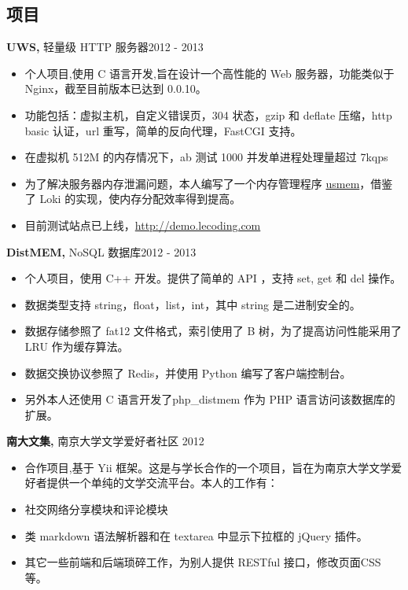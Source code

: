 \documentclass[margin]{res}
\begin{document}
\begin{resume}
\section{项目}
 {\bf UWS,} 轻量级 HTTP 服务器\hfill 2012 - 2013
 \begin{itemize} \itemsep -2pt

\item 个人项目,使用 C 语言开发,旨在设计一个高性能的 Web 服务器，功能类似于 Nginx，截至目前版本已达到 0.0.10。
\item 功能包括：虚拟主机，自定义错误页，304 状态，gzip 和 deflate 压缩，http basic 认证，url 重写，简单的反向代理，FastCGI 支持。
\item 在虚拟机 512M 的内存情况下，ab 测试 1000 并发单进程处理量超过 7kqps
\item 为了解决服务器内存泄漏问题，本人编写了一个内存管理程序 \href{https://github.com/usbuild/usmem}{usmem}，借鉴了 Loki 的实现，使内存分配效率得到提高。
\item 目前测试站点已上线，\href{http://demo.lecoding.com}{http://demo.lecoding.com}
\end{itemize}

 
 
{\bf DistMEM,} NoSQL 数据库\hfill  2012 - 2013
\begin{itemize} \itemsep -2pt
\item 个人项目，使用 C++ 开发。提供了简单的 API ，支持 set, get 和 del 操作。
\item 数据类型支持 string，float，list，int，其中 string 是二进制安全的。
\item 数据存储参照了 fat12 文件格式，索引使用了 B 树，为了提高访问性能采用了 LRU 作为缓存算法。
\item 数据交换协议参照了 Redis，并使用 Python 编写了客户端控制台。
\item 另外本人还使用 C 语言开发了php\_distmem 作为 PHP 语言访问该数据库的扩展。
\end{itemize}

{\bf 南大文集,} 南京大学文学爱好者社区 \hfill 2012
\begin{itemize} \itemsep -2pt
\item 合作项目,基于 Yii 框架。这是与学长合作的一个项目，旨在为南京大学文学爱好者提供一个单纯的文学交流平台。本人的工作有：
\item 社交网络分享模块和评论模块
\item 类 markdown 语法解析器和在 textarea 中显示下拉框的 jQuery 插件。
\item 其它一些前端和后端琐碎工作，为别人提供 RESTful 接口，修改页面CSS等。
\end{itemize}


\end{resume}
\end{document}

